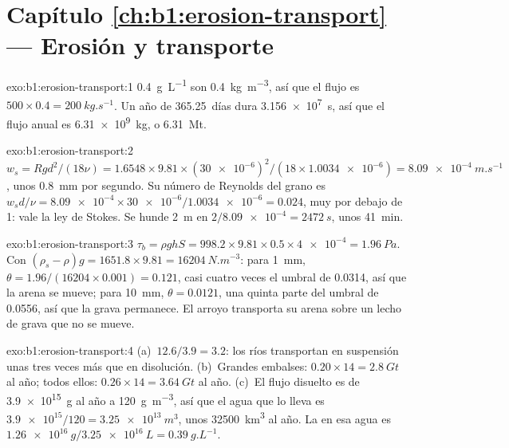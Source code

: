 \section*{Capítulo \ref{ch:b1:erosion-transport} --- Erosión y transporte}

\begin{solution}{exo:b1:erosion-transport:1}
\qty{0.4}{g.L^{-1}} son \qty{0.4}{kg.m^{-3}}, así que el flujo es $500 \times 0.4 =
\qty{200}{kg.s^{-1}}$. Un año de \num{365.25}~días dura
\qty{3.156e7}{s}, así que el flujo anual es \qty{6.31e9}{kg}, o
\qty{6.31}{Mt}.
\end{solution}

\begin{solution}{exo:b1:erosion-transport:2}
$w_s = R g d^2/(18\nu) = 1.6548 \times 9.81 \times (\num{30e-6})^2/(18 \times
\num{1.0034e-6}) = \qty{8.09e-4}{m.s^{-1}}$, unos \qty{0.8}{mm} por segundo. Su
número de Reynolds del grano es $w_s d/\nu = \num{8.09e-4} \times
\num{30e-6}/\num{1.0034e-6} = 0.024$, muy por debajo de 1: vale la ley de Stokes. Se hunde
\qty{2}{m} en $2/\num{8.09e-4} = \qty{2472}{s}$, unos
\qty{41}{min}.
\end{solution}

\begin{solution}{exo:b1:erosion-transport:3}
$\tau_b = \rho g h S = 998.2 \times 9.81 \times 0.5 \times \num{4e-4} =
\qty{1.96}{Pa}$. Con $(\rho_s - \rho) g = 1651.8 \times 9.81 =
\qty{16204}{N.m^{-3}}$: para \qty{1}{mm}, $\theta = 1.96/(16204 \times 0.001) =
0.121$, casi cuatro veces el umbral de \num{0.0314}, así que la arena se mueve; para
\qty{10}{mm}, $\theta = 0.0121$, una quinta parte del umbral de \num{0.0556}, así que la
grava permanece. El arroyo transporta su arena sobre un lecho de grava que no se mueve.
\end{solution}

\begin{solution}{exo:b1:erosion-transport:4}
(a)~$12.6/3.9 = 3.2$: los ríos transportan en suspensión unas tres veces más que en disolución. (b)~Grandes embalses: $0.20 \times 14 = \qty{2.8}{Gt}$ al
año; todos ellos: $0.26 \times 14 = \qty{3.64}{Gt}$ al año. (c)~El flujo disuelto es de \qty{3.9e15}{g} al año a \qty{120}{g.m^{-3}}, así que el agua
que lo lleva es $\num{3.9e15}/120 = \qty{3.25e13}{m^3}$, unos \qty{32500}{km^3} al año. La  en esa agua es $\qty{1.26e16}{g}/\qty{3.25e16}{L} =
\qty{0.39}{g.L^{-1}}$.
\end{solution}

